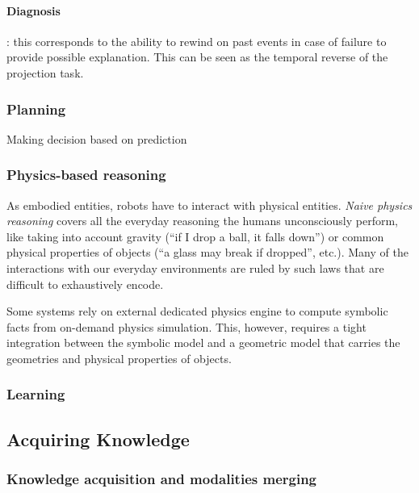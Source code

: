 \documentclass[a4paper, twocolumn]{article}
\begin{document}
\paragraph{Diagnosis}: this corresponds to the ability to rewind on past events
in case of failure to provide possible explanation. This can be seen as the
temporal reverse of the projection task.

\subsubsection{Planning}
\label{sect|planning}

Making decision based on prediction

\subsubsection{Physics-based reasoning}
\label{sect|physics}

As embodied entities, robots have to interact with physical entities.
\emph{Naive physics reasoning} covers all the everyday reasoning the humans
unconsciously perform, like taking into account gravity (``if I drop a ball, it
falls down'') or common physical properties of objects (``a glass may break if
dropped'', etc.). Many of the interactions with our everyday environments are
ruled by such laws that are difficult to exhaustively encode.

Some systems \cite{Kunze2011a} rely on external dedicated physics engine to
compute symbolic facts from on-demand physics simulation. This, however,
requires a tight integration between the symbolic model and a geometric model
that carries the geometries and physical properties of objects.

\subsubsection{Learning}
\label{sect|learning}

\subsection{Acquiring Knowledge}

\subsubsection{Knowledge acquisition and modalities merging}
\label{sect|knowledge-acquisition}
\end{document}
